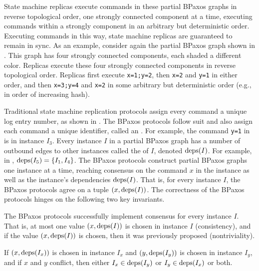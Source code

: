 State machine replicas execute commands in these partial BPaxos graphs in
reverse topological order, one strongly connected component at a time, executing
commands within a strongly component in an arbitrary but deterministic order.
Executing commands in this way, state machine replicas are guaranteed to remain
in sync. As an example, consider again the partial BPaxos graph shown in
. This graph has four strongly connected components, each
shaded a different color. Replicas execute these four strongly connected
components in reverse topological order. Replicas first execute
\texttt{x=1;y=2}, then \texttt{x=2} and \texttt{y=1} in either order, and then
\texttt{x=3;y=4} and \texttt{x=2} in some arbitrary but deterministic order
(e.g., in order of increasing hash).

Traditional state machine replication protocols assign every command a unique
log entry number, as shown in . The BPaxos protocols follow
suit and also assign each command a unique identifier, called an
. For example, the command \texttt{y=1} in 
is in instance $I_3$. Every instance $I$ in a partial BPaxos graph has a number
of outbound edges to other instances called the  of $I$,
denoted $\text{deps}(I)$. For example, in , $\text{deps}(I_5) = \{I_1,
I_4\}$.
%
The BPaxos protocols construct partial BPaxos graphs one instance at a time,
reaching consensus on the command $x$ in the instance as well as the instance's
dependencies $\text{deps}(I)$. That is, for every instance $I$, the BPaxos protocols
agree on a tuple $(x, \text{deps}(I))$.
%
The correctness of the BPaxos protocols hinges on the following two key
invariants.

\begin{invariant}
  The BPaxos protocols successfully implement consensus for every instance $I$.
  That is, at most one value $(x, \text{deps}(I))$ is chosen in instance $I$
  (consistency), and if the value $(x, \text{deps}(I))$ is chosen, then it was
  previously proposed (nontriviality).
\end{invariant}%
%
\begin{invariant}
  If $(x, \text{deps}(I_x))$ is chosen in instance $I_x$ and $(y, \text{deps}(I_y))$ is
  chosen in instance $I_y$, and if $x$ and $y$ conflict, then either $I_x \in
  \text{deps}(I_y)$ or $I_y \in \text{deps}(I_x)$ or both.
\end{invariant}

